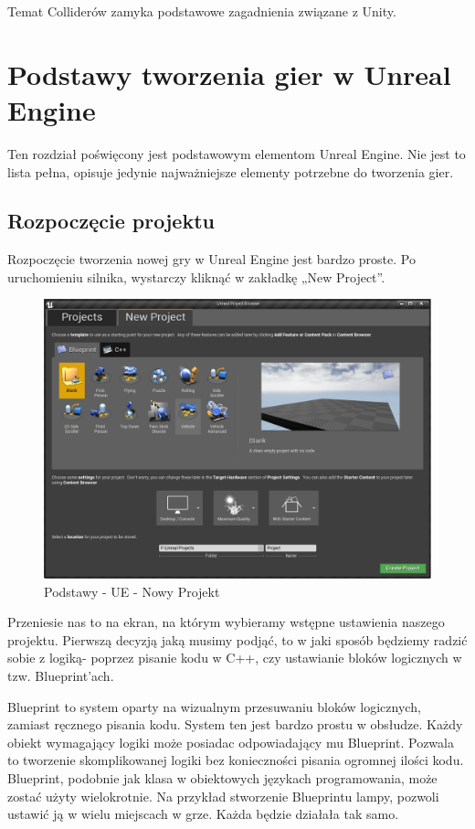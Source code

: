 \documentclass[12pt]{xmgr}
\begin{document}
Temat Colliderów zamyka podstawowe zagadnienia związane z Unity.

\chapter{Podstawy tworzenia gier w Unreal Engine}

Ten rozdział poświęcony jest podstawowym elementom Unreal Engine. Nie jest to lista pełna, opisuje jedynie najważniejsze elementy potrzebne do tworzenia gier.

\section{Rozpoczęcie projektu}

Rozpoczęcie tworzenia nowej gry w Unreal Engine jest bardzo proste. Po uruchomieniu silnika, wystarczy kliknąć w zakładkę „New Project”.

\begin{figure}[!htb]
    \begin{center}
    \includegraphics[scale=0.35]{Screeny/New_project}
    \end{center}
    \caption{Podstawy - UE - Nowy Projekt}
\end{figure}

Przeniesie nas to na ekran, na którym wybieramy wstępne ustawienia naszego projektu. Pierwszą decyzją jaką musimy podjąć, to w jaki sposób będziemy radzić sobie z logiką- poprzez pisanie kodu w C++, czy ustawianie bloków logicznych w tzw. Blueprint’ach.

Blueprint to system oparty na wizualnym przesuwaniu bloków logicznych, zamiast ręcznego pisania kodu. System ten jest bardzo prostu w obsłudze. Każdy obiekt wymagający logiki może posiadac odpowiadający mu Blueprint. Pozwala to tworzenie skomplikowanej logiki bez konieczności pisania ogromnej ilości kodu. Blueprint, podobnie jak klasa w obiektowych językach programowania, może zostać użyty wielokrotnie. Na przykład stworzenie Blueprintu lampy, pozwoli ustawić ją w wielu miejscach w grze. Każda będzie działała tak samo.
\end{document}

